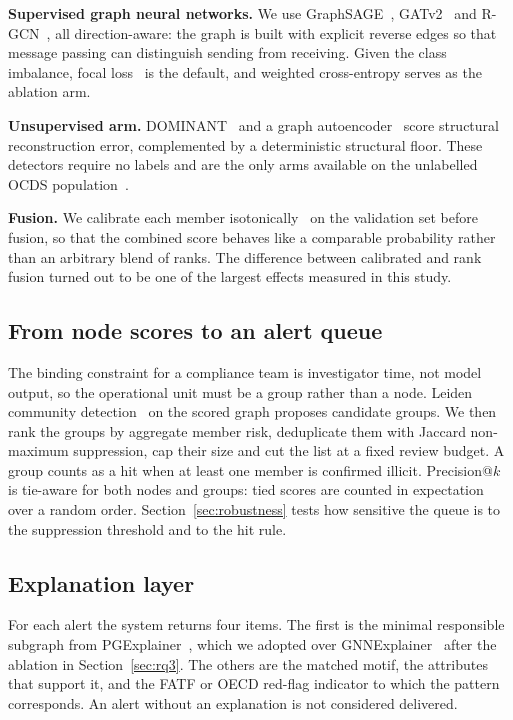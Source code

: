 \documentclass[conference]{IEEEtran}
\begin{document}
\textbf{Supervised graph neural networks.} We use GraphSAGE~\cite{sage},
GATv2~\cite{gatv2} and R-GCN~\cite{rgcn}, all direction-aware: the graph is
built with explicit reverse edges so that message passing can distinguish
sending from receiving. Given the class imbalance, focal loss~\cite{focal} is
the default, and weighted cross-entropy serves as the ablation arm.

\textbf{Unsupervised arm.} DOMINANT~\cite{dominant} and a graph
autoencoder~\cite{kipf2016} score structural reconstruction error, complemented
by a deterministic structural floor. These detectors require no labels and are
the only arms available on the unlabelled OCDS population~\cite{ocds}.

\textbf{Fusion.} We calibrate each member isotonically~\cite{zadrozny2002} on
the validation set before fusion, so that the combined score behaves like a
comparable probability rather than an arbitrary blend of ranks. The difference
between calibrated and rank fusion turned out to be one of the largest effects
measured in this study.

\subsection{From node scores to an alert queue}

The binding constraint for a compliance team is investigator time, not model
output, so the operational unit must be a group rather than a node. Leiden
community detection~\cite{leiden} on the scored graph proposes candidate groups.
We then rank the groups by aggregate member risk, deduplicate them with Jaccard
non-maximum suppression, cap their size and cut the list at a fixed review
budget. A group counts as a hit when at least one member is confirmed illicit.
Precision@$k$ is tie-aware for both nodes and groups: tied scores are counted in
expectation over a random order. Section~\ref{sec:robustness} tests how
sensitive the queue is to the suppression threshold and to the hit rule.

\subsection{Explanation layer}

For each alert the system returns four items. The first is the minimal
responsible subgraph from PGExplainer~\cite{pgexplainer}, which we adopted over
GNNExplainer~\cite{gnnexplainer} after the ablation in Section~\ref{sec:rq3}.
The others are the matched motif, the attributes that support it, and the FATF
or OECD red-flag indicator to which the pattern corresponds. An alert without
an explanation is not considered delivered.
\end{document}
